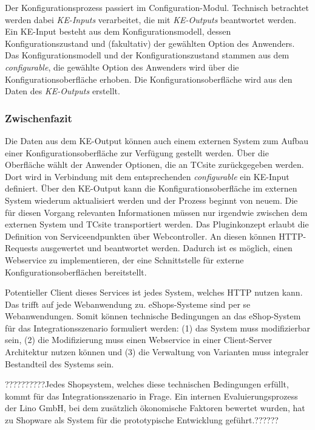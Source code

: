 \documentclass[12pt,a4paper,bibliography=totocnumbered,listof=totoc]{scrartcl}
\begin{document}
Der Konfigurationsprozess passiert im Configuration-Modul. Technisch betrachtet werden dabei \emph{KE-Inputs} verarbeitet, die mit \emph{KE-Outputs} beantwortet werden. Ein KE-Input besteht aus dem Konfigurationsmodell, dessen Konfigurationszustand und (fakultativ) der gewählten Option des Anwenders. Das Konfigurationsmodell und der Konfigurationszustand stammen aus dem \emph{configurable}, die gewählte Option des Anwenders wird über die Konfigurationsoberfläche erhoben. Die Konfigurationsoberfläche wird aus den Daten des \emph{KE-Outputs} erstellt.

\subsubsection{Zwischenfazit}
\label{subsubsection:tcsiteFazit}

Die Daten aus dem KE-Output können auch einem externen System zum Aufbau einer Konfigurationsoberfläche zur Verfügung gestellt werden. Über die Oberfläche wählt der Anwender Optionen, die an TCsite zurückgegeben werden. Dort wird in Verbindung mit dem entsprechenden \emph{configurable} ein KE-Input definiert. Über den KE-Output kann die Konfigurationsoberfläche im externen System wiederum aktualisiert werden und der Prozess beginnt von neuem. Die für diesen Vorgang relevanten Informationen müssen nur irgendwie zwischen dem externen System und TCsite transportiert werden. Das Pluginkonzept erlaubt die Definition von Serviceendpunkten über Webcontroller. An diesen können HTTP-Requests ausgewertet und beantwortet werden. Dadurch ist es möglich, einen Webservice zu implementieren, der eine Schnittstelle für externe Konfigurationsoberflächen bereitstellt.

Potentieller Client dieses Services ist jedes System, welches HTTP nutzen kann. Das trifft auf jede Webanwendung zu. eShops-Systeme sind per se Webanwendungen. Somit können technische Bedingungen an das eShop-System für das Integrationsszenario formuliert werden: (1) das System muss modifizierbar sein, (2) die Modifizierung muss einen Webservice in einer Client-Server Architektur nutzen können und (3) die Verwaltung von Varianten muss integraler Bestandteil des Systems sein.

??????????Jedes Shopsystem, welches diese technischen Bedingungen erfüllt, kommt für das Integrationsszenario in Frage. Ein internen Evaluierungsprozess der Lino GmbH, bei dem zusätzlich ökonomische Faktoren bewertet wurden, hat zu Shopware als System für die prototypische Entwicklung geführt.??????
\end{document}

